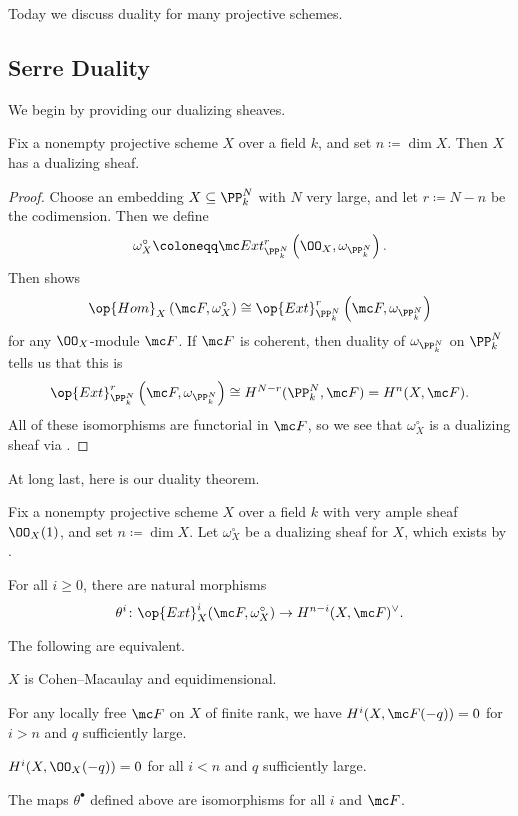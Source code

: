 \documentclass[../notes.tex]{subfiles}
\begin{document}
Today we discuss duality for many projective schemes.

\subsection{Serre Duality}
We begin by providing our dualizing sheaves.
\begin{proposition} \label{prop:get-dualizing-sheaf}
	Fix a nonempty projective scheme $X$ over a field $k$, and set $n\coloneqq\dim X$. Then $X$ has a dualizing sheaf.
\end{proposition}
\begin{proof}
	Choose an embedding $X\subseteq\PP^N_k$ with $N$ very large, and let $r\coloneqq N-n$ be the codimension. Then we define
	\[\omega_X^\circ\coloneqq\mc Ext_{\PP^N_k}^r\left(\OO_X,\omega_{\PP^N_k}\right).\]
	Then  shows
	\[\op{Hom}_X\left(\mc F,\omega_X^\circ\right)\cong\op{Ext}^r_{\PP^N_k}\left(\mc F,\omega_{\PP^N_k}\right)\]
	for any $\OO_X$-module $\mc F$. If $\mc F$ is coherent, then duality of $\omega_{\PP^N_k}$ on $\PP^N_k$ tells us that this is
	\[\op{Ext}^r_{\PP^N_k}\left(\mc F,\omega_{\PP^N_k}\right)\cong H^{N-r}(\PP^N_k,\mc F)=H^n(X,\mc F).\]
	All of these isomorphisms are functorial in $\mc F$, so we see that $\omega_X^\circ$ is a dualizing sheaf via .
\end{proof}
At long last, here is our duality theorem.
\begin{theorem}
	Fix a nonempty projective scheme $X$ over a field $k$ with very ample sheaf $\OO_X(1)$, and set $n\coloneqq\dim X$. Let $\omega_X^\circ$ be a dualizing sheaf for $X$, which exists by .
	\begin{listalph}
		\item For all $i\ge0$, there are natural morphisms
		\[\theta^i\colon\op{Ext}^i_X(\mc F,\omega_X^\circ)\to H^{n-i}(X,\mc F)^\lor.\]
		\item The following are equivalent.
		\begin{listroman}
			\item $X$ is Cohen--Macaulay and equidimensional.
			\item For any locally free $\mc F$ on $X$ of finite rank, we have $H^i(X,\mc F(-q))=0$ for $i>n$ and $q$ sufficiently large.
			\item $H^i(X,\OO_X(-q))=0$ for all $i<n$ and $q$ sufficiently large.
			\item The maps $\theta^\bullet$ defined above are isomorphisms for all $i$ and $\mc F$.
		\end{listroman}
	\end{listalph}
\end{theorem}
\end{document}
